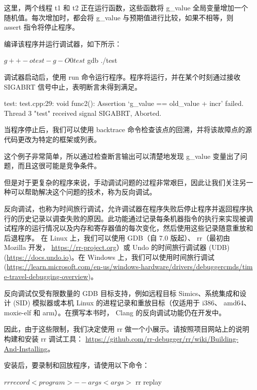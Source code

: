 这里，两个线程 t1 和 t2 正在运行函数，这些函数将 g\_value 全局变量增加一个随机值。每次增加时，都会将 g\_value 与预期值进行比较，如果不相等，则 assert 指令将停止程序。

编译该程序并运行调试器，如下所示：

\begin{shell}
$ g++ -o test -g -O0 test
$ gdb ./test
\end{shell}

调试器启动后，使用 run 命令运行程序。程序将运行，并在某个时刻通过接收 SIGABRT 信号中止，表明断言未得到满足。

\begin{shell}
test: test.cpp:29: void func2(): Assertion `g_value == old_value + incr' failed.
Thread 3 "test" received signal SIGABRT, Aborted.
\end{shell}

当程序停止后，我们可以使用 backtrace 命令检查该点的回溯，并将该故障点的源代码更改为特定的框架或列表。

这个例子非常简单，所以通过检查断言输出可以清楚地发现 g\_value 变量出了问题，而且这很可能是竞争条件。

但是对于更复杂的程序来说，手动调试问题的过程非常艰巨，因此让我们关注另一种可以帮助解决这个问题的技术，称为反向调试。


反向调试，也称为时间旅行调试，允许调试器在程序失败后停止程序并返回程序执行的历史记录以调查失败的原因。此功能通过记录每条机器指令的执行来实现被调试程序的运行情况以及内存和寄存器值的每次变化，然后使用这些记录随意重放和后退程序。
在 Linux 上，我们可以使用 GDB（自 7.0 版起）、 rr（最初由 Mozilla 开发， \url{https://rr-project.org}）或 Undo 的时间旅行调试器 (UDB) (\url{https://docs.undo.io})。在 Windows 上，我们可以使用时间旅行调试 (\url{https://learn.microsoft.com/en-us/windows-hardware/drivers/debuggercmds/tim e-travel-debugging-overview})。

反向调试仅受有限数量的 GDB 目标支持，例如远程目标 Simics、系统集成和设计 (SID) 模拟器或本机 Linux 的进程记录和重放目标（仅适用于 i386、 amd64、 moxie-elf 和 arm）。在撰写本书时， Clang 的反向调试功能仍在开发中。

因此，由于这些限制，我们决定使用 rr 做一个小展示。请按照项目网站上的说明构建和安装 rr 调试工具： \url{https://github.com/rr-debugger/rr/wiki/Building-And-Installing}。

安装后，要录制和回放程序，请使用以下命令：

\begin{shell}
$ rr record <program> --args <args>
$ rr replay
\end{shell}

